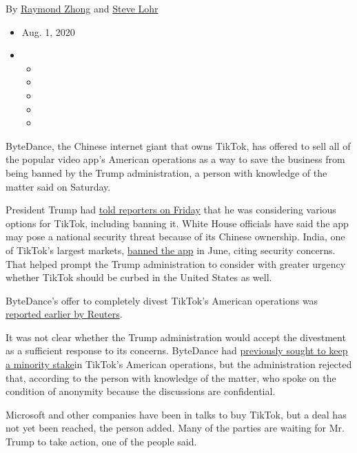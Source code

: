 By \href{https://www.nytimes.com/by/raymond-zhong}{Raymond Zhong} and
\href{https://www.nytimes.com/by/steve-lohr}{Steve Lohr}

\begin{itemize}
\item
  Aug. 1, 2020
\item
  \begin{itemize}
  \item
  \item
  \item
  \item
  \item
  \end{itemize}
\end{itemize}

ByteDance, the Chinese internet giant that owns TikTok, has offered to
sell all of the popular video app's American operations as a way to save
the business from being banned by the Trump administration, a person
with knowledge of the matter said on Saturday.

President Trump had
\href{https://www.nytimes.com/2020/07/31/technology/tiktok-microsoft.html}{told
reporters on Friday} that he was considering various options for TikTok,
including banning it. White House officials have said the app may pose a
national security threat because of its Chinese ownership. India, one of
TikTok's largest markets,
\href{https://www.nytimes.com/2020/06/30/technology/india-china-tiktok.html}{banned
the app} in June, citing security concerns. That helped prompt the Trump
administration to consider with greater urgency whether TikTok should be
curbed in the United States as well.

ByteDance's offer to completely divest TikTok's American operations was
\href{https://www.reuters.com/article/us-usa-tiktok-bytedance-exclusive-idUSKBN24X3SK}{reported
earlier by Reuters}.

It was not clear whether the Trump administration would accept the
divestment as a sufficient response to its concerns. ByteDance had
\href{https://www.nytimes.com/2020/07/23/business/dealbook/tiktok-bytedance-investors-trump.html?searchResultPosition=2}{previously
sought to keep a minority stake}in TikTok's American operations, but the
administration rejected that, according to the person with knowledge of
the matter, who spoke on the condition of anonymity because the
discussions are confidential.

Microsoft and other companies have been in talks to buy TikTok, but a
deal has not yet been reached, the person added. Many of the parties are
waiting for Mr. Trump to take action, one of the people said.


